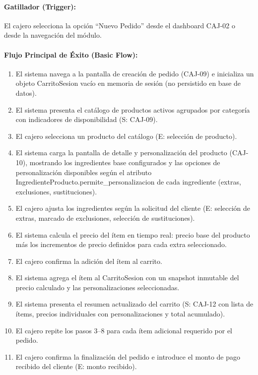\paragraph{Gatillador (Trigger):} El cajero selecciona la opción ``Nuevo Pedido'' desde el dashboard CAJ-02 o desde la navegación del módulo.

\paragraph{Flujo Principal de Éxito (Basic Flow):}
\begin{enumerate}
    \item[I.] El sistema navega a la pantalla de creación de pedido (CAJ-09) e inicializa un objeto CarritoSesion vacío en memoria de sesión (no persistido en base de datos).
    \item[II.] El sistema presenta el catálogo de productos activos agrupados por categoría con indicadores de disponibilidad (S: CAJ-09).
    \item[III.] El cajero selecciona un producto del catálogo (E: selección de producto).
    \item[IV.] El sistema carga la pantalla de detalle y personalización del producto (CAJ-10), mostrando los ingredientes base configurados y las opciones de personalización disponibles según el atributo IngredienteProducto.permite\_personalizacion de cada ingrediente (extras, exclusiones, sustituciones).
    \item[V.] El cajero ajusta los ingredientes según la solicitud del cliente (E: selección de extras, marcado de exclusiones, selección de sustituciones).
    \item[VI.] El sistema calcula el precio del ítem en tiempo real: precio base del producto más los incrementos de precio definidos para cada extra seleccionado.
    \item[VII.] El cajero confirma la adición del ítem al carrito.
    \item[VIII.] El sistema agrega el ítem al CarritoSesion con un snapshot inmutable del precio calculado y las personalizaciones seleccionadas.
    \item[IX.] El sistema presenta el resumen actualizado del carrito (S: CAJ-12 con lista de ítems, precios individuales con personalizaciones y total acumulado).
    \item[X.] El cajero repite los pasos 3--8 para cada ítem adicional requerido por el pedido.
    \item[XI.] El cajero confirma la finalización del pedido e introduce el monto de pago recibido del cliente (E: monto recibido).

\end{enumerate}
